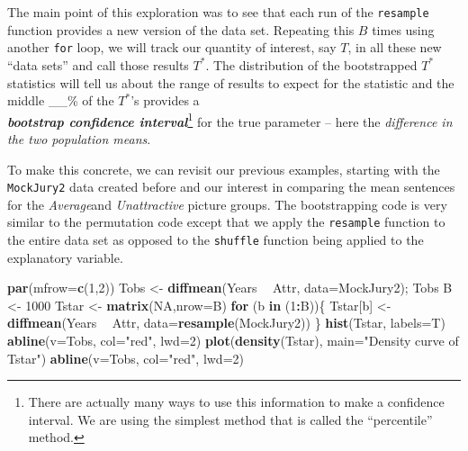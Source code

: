 \documentclass[]{book}
\newenvironment{Shaded}{\begin{snugshade}}{\end{snugshade}}
\newcommand{\KeywordTok}[1]{\textcolor[rgb]{0.13,0.29,0.53}{\textbf{#1}}}
\newcommand{\DataTypeTok}[1]{\textcolor[rgb]{0.13,0.29,0.53}{#1}}
\newcommand{\DecValTok}[1]{\textcolor[rgb]{0.00,0.00,0.81}{#1}}
\newcommand{\StringTok}[1]{\textcolor[rgb]{0.31,0.60,0.02}{#1}}
\newcommand{\OtherTok}[1]{\textcolor[rgb]{0.56,0.35,0.01}{#1}}
\newcommand{\ControlFlowTok}[1]{\textcolor[rgb]{0.13,0.29,0.53}{\textbf{#1}}}
\newcommand{\OperatorTok}[1]{\textcolor[rgb]{0.81,0.36,0.00}{\textbf{#1}}}
\newcommand{\NormalTok}[1]{#1}
\let\rmarkdownfootnote\footnote%
\def\footnote{\protect\rmarkdownfootnote}
\begin{document}
The main point of this exploration was to see that each run of the
\texttt{resample} function provides a new version of the data set.
Repeating this \(B\) times using another \texttt{for} loop, we will
track our quantity of interest, say \(T\), in all these new ``data
sets'' and call those results \(T^*\). The distribution of the
bootstrapped \(T^*\) statistics will tell us about the range of results
to expect for the statistic and the middle \_\_\% of the \(T^*\)'s
provides a\\
\textbf{\emph{bootstrap confidence interval}}\footnote{There are
  actually many ways to use this information to make a confidence
  interval. We are using the simplest method that is called the
  ``percentile'' method.} for the true parameter -- here the
\emph{difference in the two population means}.

To make this concrete, we can revisit our previous examples, starting
with the \texttt{MockJury2} data created before and our interest in
comparing the mean sentences for the \emph{Average}and
\emph{Unattractive} picture groups. The bootstrapping code is very
similar to the permutation code except that we apply the
\texttt{resample} function to the entire data set as opposed to the
\texttt{shuffle} function being applied to the explanatory variable.





\begin{Shaded}
\begin{Highlighting}[]
\KeywordTok{par}\NormalTok{(}\DataTypeTok{mfrow=}\KeywordTok{c}\NormalTok{(}\DecValTok{1}\NormalTok{,}\DecValTok{2}\NormalTok{))}
\NormalTok{Tobs <-}\StringTok{ }\KeywordTok{diffmean}\NormalTok{(Years }\OperatorTok{~}\StringTok{ }\NormalTok{Attr, }\DataTypeTok{data=}\NormalTok{MockJury2); Tobs}
\NormalTok{B <-}\StringTok{ }\DecValTok{1000}
\NormalTok{Tstar <-}\StringTok{ }\KeywordTok{matrix}\NormalTok{(}\OtherTok{NA}\NormalTok{,}\DataTypeTok{nrow=}\NormalTok{B)}
\ControlFlowTok{for}\NormalTok{ (b }\ControlFlowTok{in}\NormalTok{ (}\DecValTok{1}\OperatorTok{:}\NormalTok{B))\{}
\NormalTok{  Tstar[b] <-}\StringTok{ }\KeywordTok{diffmean}\NormalTok{(Years }\OperatorTok{~}\StringTok{ }\NormalTok{Attr, }\DataTypeTok{data=}\KeywordTok{resample}\NormalTok{(MockJury2))}
\NormalTok{  \}}
\KeywordTok{hist}\NormalTok{(Tstar, }\DataTypeTok{labels=}\NormalTok{T)}
\KeywordTok{abline}\NormalTok{(}\DataTypeTok{v=}\NormalTok{Tobs, }\DataTypeTok{col=}\StringTok{"red"}\NormalTok{, }\DataTypeTok{lwd=}\DecValTok{2}\NormalTok{)}
\KeywordTok{plot}\NormalTok{(}\KeywordTok{density}\NormalTok{(Tstar), }\DataTypeTok{main=}\StringTok{"Density curve of Tstar"}\NormalTok{)}
\KeywordTok{abline}\NormalTok{(}\DataTypeTok{v=}\NormalTok{Tobs, }\DataTypeTok{col=}\StringTok{"red"}\NormalTok{, }\DataTypeTok{lwd=}\DecValTok{2}\NormalTok{)}
\end{Highlighting}
\end{Shaded}
\end{document}
